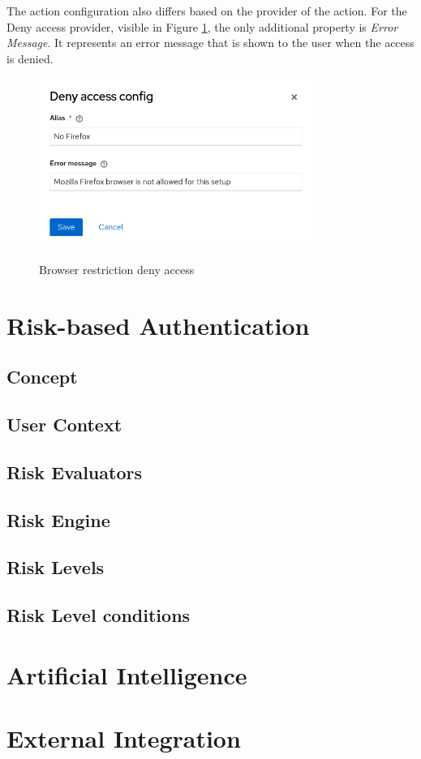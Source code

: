 The action configuration also differs based on the provider of the action.
For the Deny access provider, visible in Figure \ref{fig:design-policy-browser-flow-deny}, the only additional property is \textit{Error Message}.
It represents an error message that is shown to the user when the access is denied.

\begin{figure}[htbp]
  \centering
  \includegraphics[width=0.8\textwidth]{img/sections/5-design/policy-browser-deny.png}
  \label{fig:design-policy-browser-flow-deny}
  \caption{Browser restriction deny access}
\end{figure}

\newpage
\section{Risk-based Authentication}
\subsection{Concept}
\subsection{User Context}
\subsection{Risk Evaluators}
\subsection{Risk Engine}
\subsection{Risk Levels}
\subsection{Risk Level conditions}


\section{Artificial Intelligence}


\section{External Integration}